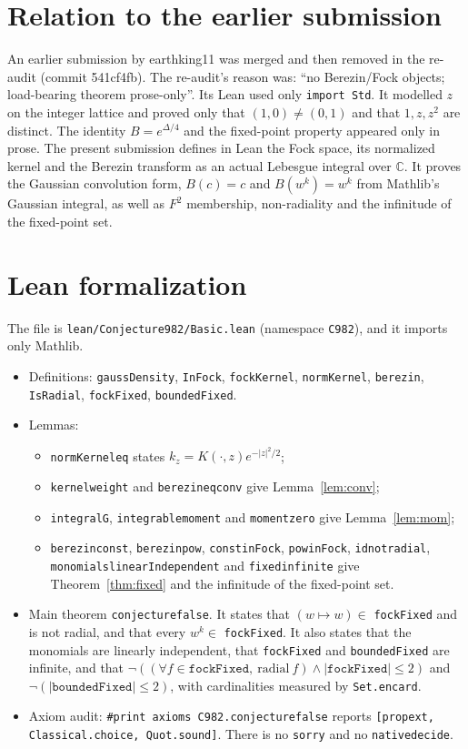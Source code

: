 \documentclass[11pt]{article}
\renewcommand{\_}{\oldus\allowbreak}
\theoremstyle{definition}
\theoremstyle{remark}
\newcommand{\C}{\mathbb{C}}
\begin{document}
\section{Relation to the earlier submission}
An earlier submission by earthking11 was merged and then removed in the re-audit (commit 541cf4fb). The
re-audit's reason was: ``no Berezin/Fock objects; load-bearing theorem prose-only''. Its Lean used only
\texttt{import Std}. It modelled $z$ on the integer lattice and proved only that $(1,0)\ne(0,1)$ and that
$1,z,z^2$ are distinct. The identity $B=e^{\Delta/4}$ and the fixed-point property appeared only in prose.
The present submission defines in Lean the Fock space, its normalized kernel and the Berezin transform as
an actual Lebesgue integral over $\C$. It proves the Gaussian convolution form, $B(c)=c$ and
$B(w^k)=w^k$ from Mathlib's Gaussian integral, as well as $F^2$ membership, non-radiality and the
infinitude of the fixed-point set.

\section{Lean formalization}
The file is \texttt{lean/Conjecture982/Basic.lean} (namespace \texttt{C982}), and it imports only Mathlib.

\begin{itemize}
\item Definitions: \texttt{gaussDensity}, \texttt{InFock}, \texttt{fockKernel}, \texttt{normKernel},
\texttt{berezin}, \texttt{IsRadial}, \texttt{fockFixed}, \texttt{boundedFixed}.
\item Lemmas:
  \begin{itemize}
  \item \texttt{normKernel\_eq} states $k_z=K(\cdot,z)e^{-|z|^2/2}$;
  \item \texttt{kernel\_weight} and \texttt{berezin\_eq\_conv} give Lemma~\ref{lem:conv};
  \item \texttt{integral\_G}, \texttt{integrable\_moment} and \texttt{moment\_zero} give
    Lemma~\ref{lem:mom};
  \item \texttt{berezin\_const}, \texttt{berezin\_pow}, \texttt{const\_inFock}, \texttt{pow\_inFock},
    \texttt{id\_not\_radial}, \texttt{monomials\_linearIndependent} and \texttt{fixed\_infinite} give
    Theorem~\ref{thm:fixed} and the infinitude of the fixed-point set.
  \end{itemize}
\item Main theorem \texttt{conjecture\_982\_false}. It states that $(w\mapsto w)\in$ \texttt{fockFixed} and
is not radial, and that every $w^k\in$ \texttt{fockFixed}. It also states that the monomials are linearly
independent, that \texttt{fockFixed} and \texttt{boundedFixed} are infinite, and that
$\neg((\forall f\in\texttt{fockFixed},\ \mathrm{radial}\ f)\wedge |\texttt{fockFixed}|\le2)$ and
$\neg(|\texttt{boundedFixed}|\le 2)$, with cardinalities measured by \texttt{Set.encard}.
\item Axiom audit: \texttt{\#print axioms C982.conjecture\_982\_false} reports \texttt{[propext,
Classical.choice, Quot.sound]}. There is no \texttt{sorry} and no \texttt{native\_decide}.
\end{itemize}
\end{document}
